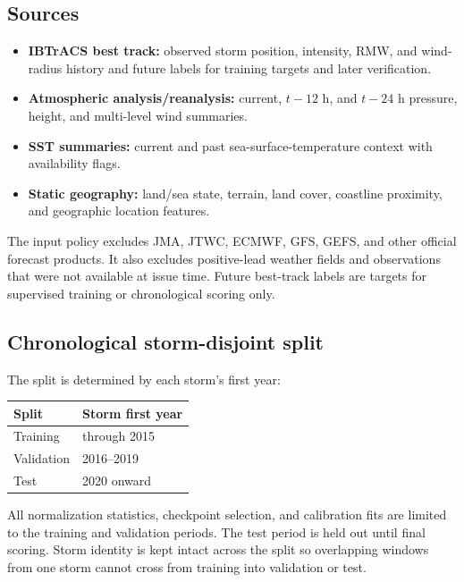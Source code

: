 \documentclass[11pt]{article}
\begin{document}
\subsection{Sources}

\begin{itemize}
\item \textbf{IBTrACS best track:} observed storm position, intensity,
      RMW, and wind-radius history and future labels for training targets and
      later verification.
\item \textbf{Atmospheric analysis/reanalysis:} current, \(t-12\) h, and
      \(t-24\) h pressure, height, and multi-level wind summaries.
\item \textbf{SST summaries:} current and past sea-surface-temperature
      context with availability flags.
\item \textbf{Static geography:} land/sea state, terrain, land cover,
      coastline proximity, and geographic location features.
\end{itemize}

The input policy excludes JMA, JTWC, ECMWF, GFS, GEFS, and other official
forecast products.  It also excludes positive-lead weather fields and
observations that were not available at issue time.  Future best-track labels
are targets for supervised training or chronological scoring only.

\subsection{Chronological storm-disjoint split}

The split is determined by each storm's first year:
\begin{center}
\begin{tabular}{ll}
\toprule
\textbf{Split} & \textbf{Storm first year}\\
\midrule
Training & through 2015\\
Validation & 2016--2019\\
Test & 2020 onward\\
\bottomrule
\end{tabular}
\end{center}

All normalization statistics, checkpoint selection, and calibration fits are
limited to the training and validation periods.  The test period is held out
until final scoring.  Storm identity is kept intact across the split so
overlapping windows from one storm cannot cross from training into
validation or test.
\end{document}
